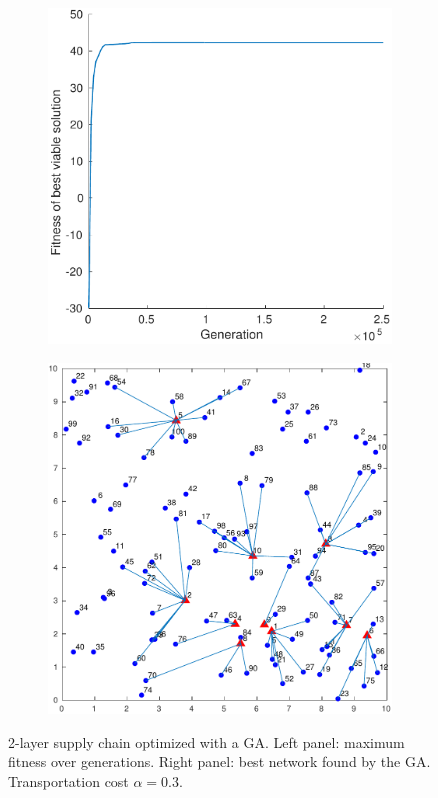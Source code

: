 \documentclass[12pt,titlepage]{article}
\begin{document}
\begin{figure}[hbtp]
    \centering
    \begin{subfigure}[b]{0.475\textwidth}
        \includegraphics[width=\textwidth]{fitness_2l_03.pdf}
    \end{subfigure}%
    \hfill%
    \begin{subfigure}[b]{0.475\textwidth}
        \includegraphics[width=\textwidth]{network_2l_03.pdf}
    \end{subfigure}
    \caption{2-layer supply chain optimized with a GA. Left panel: maximum fitness over generations. Right panel: best network found by the GA. Transportation cost $\alpha = 0.3$.}\label{fig:GA_0.3}
\end{figure}
\end{document}
